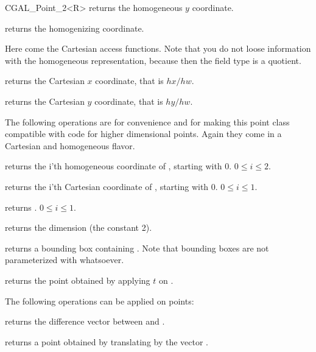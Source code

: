 \begin {classtemplate} {CGAL_Point_2<R>}
       {returns the homogeneous $y$ coordinate.}

       {returns the homogenizing  coordinate.}

Here come the Cartesian access functions. Note that you do not loose
information with the homogeneous representation, because then the field
type is a quotient.

       {returns the Cartesian $x$ coordinate, that is $hx/hw$.}

       {returns the Cartesian $y$ coordinate, that is $hy/hw$.}


The following operations are for convenience and for making this
point class compatible with code for higher dimensional points.
Again they come in a Cartesian and homogeneous flavor.

       {returns the i'th homogeneous coordinate of \var, starting with 0.
        \precond $0\leq i \leq 2$.}

       {returns the i'th Cartesian coordinate of \var, starting with 0.
        \precond $0\leq i \leq 1$.}

       {returns .
        \precond $0\leq i \leq 1$.}

       {returns the dimension (the constant 2).}

       {returns a bounding box containing \var. Note that bounding boxes
        are not parameterized with whatsoever. }

       {returns the point obtained by applying $t$ on \var.}



The following operations can be applied on points:

       {returns the difference vector between  and .}

       {returns a point obtained by translating  by the 
        vector .}


\end{classtemplate}
